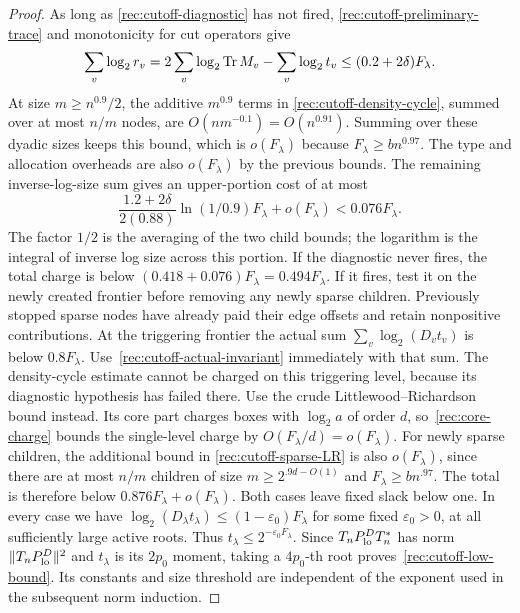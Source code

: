 \begin{proof}
As long as \eqref{rec:cutoff-diagnostic} has not fired,
\eqref{rec:cutoff-preliminary-trace} and monotonicity for cut
operators give
\[
 \sum_v\log_2r_v
 =2\sum_v\log_2\operatorname{Tr} M_v-\sum_v\log_2t_v
 \le(0.2+2\delta)F_\lambda.
\]
At size $m\ge n^{0.9}/2$, the additive $m^{0.9}$ terms in
\eqref{rec:cutoff-density-cycle}, summed over at most $n/m$ nodes,
are $O(nm^{-0.1})=O(n^{0.91})$.  Summing over these dyadic sizes
keeps this bound, which is $o(F_\lambda)$ because
$F_\lambda\ge b n^{0.97}$.  The type and allocation overheads are
also $o(F_\lambda)$ by the previous bounds.
The remaining inverse-log-size sum gives an upper-portion cost of at most
\begin{equation}\label{rec:cutoff-upper-cost}
 \frac{1.2+2\delta}{2(0.88)}\ln(1/0.9)F_\lambda+o(F_\lambda)
 <0.076F_\lambda.
\end{equation}
The factor $1/2$ is the averaging of the two child bounds; the
logarithm is the integral of inverse log size across this portion.
If the diagnostic never fires, the total charge is below
$(0.418+0.076)F_\lambda=0.494F_\lambda$.
If it fires, test it on the newly created frontier before removing any
newly sparse children.  Previously stopped sparse nodes have already
paid their edge offsets and retain nonpositive contributions.  At the
triggering frontier the actual sum
$\sum_v\log_2(D_vt_v)$ is below $0.8F_\lambda$.
Use~\eqref{rec:cutoff-actual-invariant} immediately with that sum.
The density-cycle estimate cannot be charged on this triggering level,
because its diagnostic hypothesis has failed there.  Use the crude
Littlewood--Richardson bound instead.  Its core part charges boxes with
$\log_2a$ of order $d$, so~\eqref{rec:core-charge} bounds the
single-level charge by $O(F_\lambda/d)=o(F_\lambda)$.
For newly sparse children, the additional bound in
\eqref{rec:cutoff-sparse-LR} is also $o(F_\lambda)$, since there
are at most $n/m$ children of size $m\ge2^{.9d-O(1)}$ and
$F_\lambda\ge b n^{.97}$.  The total is therefore below
$0.876F_\lambda+o(F_\lambda)$.  Both cases leave fixed slack below one.
In every case we have
$\log_2(D_\lambda t_\lambda)\le(1-\varepsilon_0)F_\lambda$
for some fixed $\varepsilon_0>0$, at all sufficiently large active
roots.  Thus $t_\lambda\le2^{-\varepsilon_0F_\lambda}$.
Since $T_nP_{\rm lo}^DT_n^*$ has norm
$\|T_nP_{\rm lo}^D\|^2$ and $t_\lambda$ is its $2p_0$ moment,
taking a $4p_0$-th root proves~\eqref{rec:cutoff-low-bound}.
Its constants and size threshold are independent of the exponent used
in the subsequent norm induction.
\end{proof}

